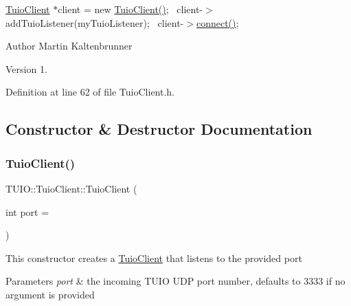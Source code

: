 {\ttfamily  \hyperlink{class_t_u_i_o_1_1_tuio_client}{Tuio\+Client} $\ast$client = new \hyperlink{class_t_u_i_o_1_1_tuio_client_a5c270932c095fe9f88caef9a18864cfa}{Tuio\+Client()};~\newline
 client-\/$>$add\+Tuio\+Listener(my\+Tuio\+Listener);~\newline
 client-\/$>$\hyperlink{class_t_u_i_o_1_1_tuio_client_affe2a075119d66e3047e29a5438c6af5}{connect()};~\newline
 }

\begin{DoxyAuthor}{Author}
Martin Kaltenbrunner 
\end{DoxyAuthor}
\begin{DoxyVersion}{Version}
1. 
\end{DoxyVersion}


Definition at line 62 of file Tuio\+Client.\+h.



\subsection{Constructor \& Destructor Documentation}
\mbox{\label{class_t_u_i_o_1_1_tuio_client_a5c270932c095fe9f88caef9a18864cfa}} 
\subsubsection{\texorpdfstring{Tuio\+Client()}{TuioClient()}}
{\footnotesize\ttfamily T\+U\+I\+O\+::\+Tuio\+Client\+::\+Tuio\+Client (\begin{DoxyParamCaption}\item[{int}]{port = {} }\end{DoxyParamCaption})}

This constructor creates a \hyperlink{class_t_u_i_o_1_1_tuio_client}{Tuio\+Client} that listens to the provided port


\begin{DoxyParams}{Parameters}
{\em port} & the incoming T\+U\+IO U\+DP port number, defaults to 3333 if no argument is provided \\
\hline
\end{DoxyParams}
\mbox{\label{class_t_u_i_o_1_1_tuio_client_a8d93ce8f2ed78b1430ac0904adcc1f73}} 
